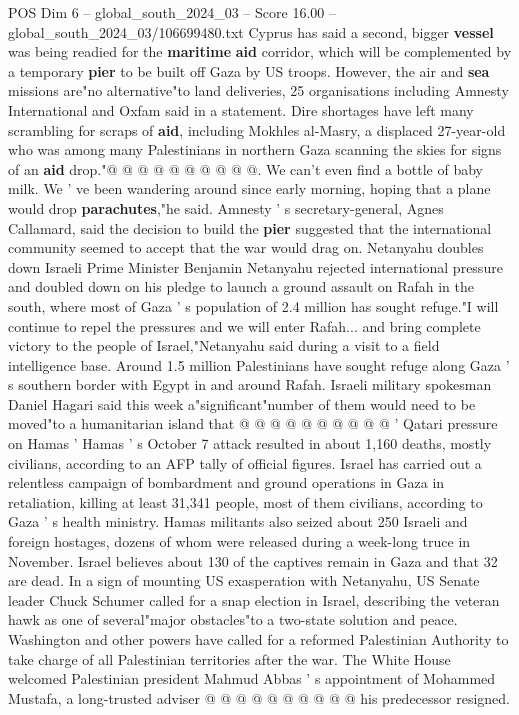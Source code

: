 \begin{textsample}{POS Dim 6 – global\_south\_2024\_03 – Score 16.00 – global\_south\_2024\_03/106699480.txt}
Cyprus has said a second, bigger \textbf{vessel} was being readied for the \textbf{maritime} \textbf{aid} corridor, which will be complemented by a temporary \textbf{pier} to be built off Gaza by US troops.
However, the air and \textbf{sea} missions are"no alternative"to land deliveries, 25 organisations including Amnesty International and Oxfam said in a statement.
Dire shortages have left many scrambling for scraps of \textbf{aid}, including Mokhles al-Masry, a displaced 27-year-old who was among many Palestinians in northern Gaza scanning the skies for signs of an \textbf{aid} drop."@ @ @ @ @ @ @ @ @ @.
We can't even find a bottle of baby milk.
We ' ve been wandering around since early morning, hoping that a plane would drop \textbf{parachutes},"he said.
Amnesty ' s secretary-general, Agnes Callamard, said the decision to build the \textbf{pier} suggested that the international community seemed to accept that the war would drag on.
Netanyahu doubles down Israeli Prime Minister Benjamin Netanyahu rejected international pressure and doubled down on his pledge to launch a ground assault on Rafah in the south, where most of Gaza ' s population of 2.4 million has sought refuge."I will continue to repel the pressures and we will enter Rafah... and bring complete victory to the people of Israel,"Netanyahu said during a visit to a field intelligence base.
Around 1.5 million Palestinians have sought refuge along Gaza ' s southern border with Egypt in and around Rafah.
Israeli military spokesman Daniel Hagari said this week a"significant"number of them would need to be moved"to a humanitarian island that @ @ @ @ @ @ @ @ @ @ ' Qatari pressure on Hamas ' Hamas ' s October 7 attack resulted in about 1,160 deaths, mostly civilians, according to an AFP tally of official figures.
Israel has carried out a relentless campaign of bombardment and ground operations in Gaza in retaliation, killing at least 31,341 people, most of them civilians, according to Gaza ' s health ministry.
Hamas militants also seized about 250 Israeli and foreign hostages, dozens of whom were released during a week-long truce in November.
Israel believes about 130 of the captives remain in Gaza and that 32 are dead.
In a sign of mounting US exasperation with Netanyahu, US Senate leader Chuck Schumer called for a snap election in Israel, describing the veteran hawk as one of several"major obstacles"to a two-state solution and peace.
Washington and other powers have called for a reformed Palestinian Authority to take charge of all Palestinian territories after the war.
The White House welcomed Palestinian president Mahmud Abbas ' s appointment of Mohammed Mustafa, a long-trusted adviser @ @ @ @ @ @ @ @ @ @ his predecessor resigned.

\end{textsample}
